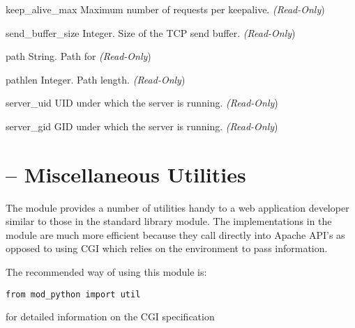 \begin{memberdesc}[server]{keep_alive_max}
Maximum number of requests per keepalive.
\emph{(Read-Only})
\end{memberdesc}

\begin{memberdesc}[server]{send_buffer_size}
Integer. Size of the TCP send buffer.
\emph{(Read-Only})
\end{memberdesc}

\begin{memberdesc}[server]{path}
String. Path for 
\emph{(Read-Only})
\end{memberdesc}

\begin{memberdesc}[server]{pathlen}
Integer. Path length.
\emph{(Read-Only})
\end{memberdesc}

\begin{memberdesc}[server]{server_uid}
UID under which the server is running.
\emph{(Read-Only})
\end{memberdesc}

\begin{memberdesc}[server]{server_gid}
GID under which the server is running.
\emph{(Read-Only})
\end{memberdesc}

\section{ -- Miscellaneous Utilities\label{pyapi-util}}

The  module provides a number of utilities handy to a web
application developer similar to those in the standard library
 module. The implementations in the  module
are much more efficient because they call directly into Apache API's
as opposed to using CGI which relies on the environment to pass
information.

The recommended way of using this module is:
\begin{verbatim}
from mod_python import util
\end{verbatim}

\begin{seealso}
	{for detailed information on the CGI specification}
\end{seealso}

